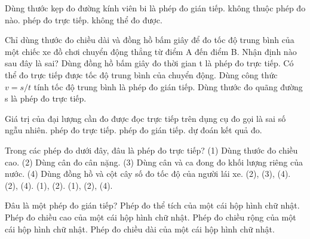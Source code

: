\begin{ex}
Dùng thước kẹp đo đường kính viên bi là
\choice
{phép đo gián tiếp.}
{không thuộc phép đo nào.}
{\True phép đo trực tiếp.}
{không thể đo được.}
\end{ex}

\begin{ex}
Chỉ dùng thước đo chiều dài và đồng hồ bấm giây để đo tốc độ trung bình của một chiếc xe đồ chơi chuyển động thẳng từ điểm A đến điểm B. Nhận định nào sau đây là sai?
\choice
{Dùng đồng hồ bấm giây đo thời gian t là phép đo trực tiếp.}
{\True Có thể đo trực tiếp được tốc độ trung bình của chuyển động.}
{Dùng công thức $v = s/t$ tính tốc độ trung bình là phép đo gián tiếp.}
{Dùng thước đo quãng đường s là phép đo trực tiếp.}
\end{ex}

\begin{ex}
Giá trị của đại lượng cần đo được đọc trực tiếp trên dụng cụ đo gọi là
\choice
{sai số ngẫu nhiên.}
{\True phép đo trực tiếp.}
{phép đo gián tiếp.}
{dự đoán kết quả đo.}
\end{ex}

\begin{ex}
Trong các phép đo dưới đây, đâu là phép đo trực tiếp?
(1) Dùng thước đo chiều cao.
(2) Dùng cân đo cân nặng.
(3) Dùng cân và ca đong đo khối lượng riêng của nước.
(4) Dùng đồng hồ và cột cây số đo tốc độ của người lái xe.
\choice
{(2), (3), (4).}
{(2), (4).}
{\True (1), (2).}
{(1), (2), (4).}
\end{ex}

\begin{ex}
Đâu là một phép đo gián tiếp?
\choice
{\True Phép đo thể tích của một cái hộp hình chữ nhật.}
{Phép đo chiều cao của một cái hộp hình chữ nhật.}
{Phép đo chiều rộng của một cái hộp hình chữ nhật.}
{Phép đo chiều dài của một cái hộp hình chữ nhật.}
\end{ex}

